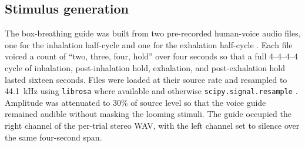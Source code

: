 \subsection{Stimulus generation}
\label{study5:sec:stim_gen}

The box-breathing guide was built from two pre-recorded human-voice audio files, one for the inhalation half-cycle and one for the exhalation half-cycle \citep{pydub_audiosegment_note}. Each file voiced a count of ``two, three, four, hold'' over four seconds so that a full 4--4--4--4 cycle of inhalation, post-inhalation hold, exhalation, and post-exhalation hold lasted sixteen seconds. Files were loaded at their source rate and resampled to 44.1~kHz using \texttt{librosa} where available and otherwise \texttt{scipy.signal.resample} \citep{Virtanen2020SciPy, librosa_resample_note}. Amplitude was attenuated to 30\% of source level so that the voice guide remained audible without masking the looming stimuli. The guide occupied the right channel of the per-trial stereo WAV, with the left channel set to silence over the same four-second span.

